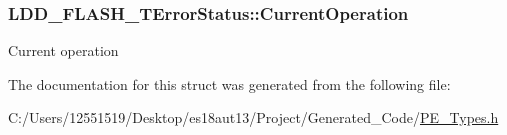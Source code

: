 \subsubsection[{Current\+Operation}]{ L\+D\+D\+\_\+\+F\+L\+A\+S\+H\+\_\+\+T\+Error\+Status\+::\+Current\+Operation}\label{struct_l_d_d___f_l_a_s_h___t_error_status_aa1b99bfba14fdc8379522df15da47e7b}
Current operation 

The documentation for this struct was generated from the following file\+:\begin{DoxyCompactItemize}
\item 
C\+:/\+Users/12551519/\+Desktop/es18aut13/\+Project/\+Generated\+\_\+\+Code/\hyperlink{_p_e___types_8h}{P\+E\+\_\+\+Types.\+h}\end{DoxyCompactItemize}
